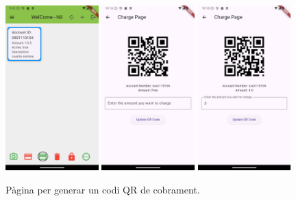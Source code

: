 \documentclass[a4paper,12pt,twoside]{ThesisStyle}
\begin{document}
\begin{figure}[h]
    \centering
    \includegraphics[width=0.32\textwidth]{imatges/mainpageAccount3.png}
    \includegraphics[width=0.32\textwidth]{imatges/chargePage.png}
    \includegraphics[width=0.32\textwidth]{imatges/chargePageWithValue.png}
    \caption{Pàgina per generar un codi QR de cobrament.}
    \label{fig: Pàgina per generar codi QR de cobrament}
\end{figure}
\end{document}
